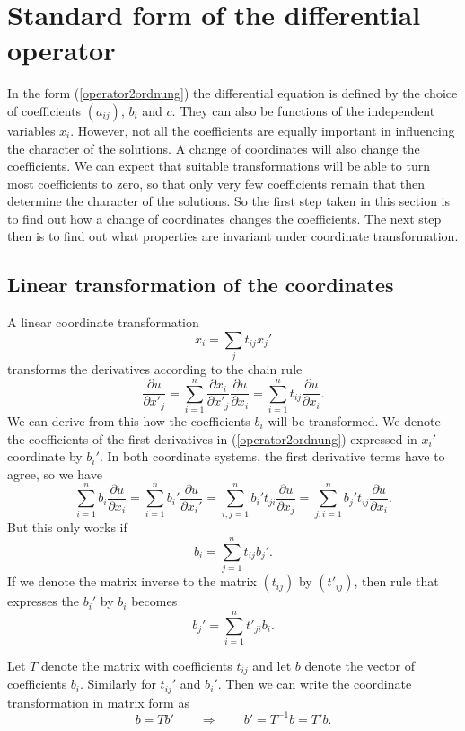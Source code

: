 %
%
%
\section{Standard form of the differential operator}
In the form (\ref{operator2ordnung})
the differential equation is defined by the choice of coefficients
$(a_{ij})$, $b_i$ and $c$.
They can also be functions of the independent variables $x_i$.
However, not all the coefficients are equally important in influencing
the character of the solutions.
A change of coordinates will also change the coefficients.
We can expect that suitable transformations will be able to turn
most coefficients to zero, so that only very few coefficients remain
that then determine the character of the solutions.
So the first step taken in this section is to find out how a change
of coordinates changes the coefficients.
The next step then is to find out what properties are invariant
under coordinate transformation.

\subsection{Linear transformation of the coordinates
\label{lineare-transformation}}
A linear coordinate transformation
\[
x_i=\sum_{j}t_{ij}x_j'
\]
transforms the derivatives according to the chain rule
\[
\frac{\partial u}{\partial x'_j}
=
\sum_{i=1}^n
\frac{\partial x_i}{\partial x'_j} \frac{\partial u}{\partial x_i}
=
\sum_{i=1}^nt_{ij}\frac{\partial u}{\partial x_i}.
\]
We can derive from this how the coefficients $b_i$ will be transformed.
We denote the coefficients of the first derivatives in
(\ref{operator2ordnung}) expressed in $x_i'$-coordinate by $b_i'$.
In both coordinate systems, the first derivative terms have to agree, so
we have
\[
\sum_{i=1}^n b_i\frac{\partial u}{\partial x_i}
=
\sum_{i=1}^n b_i'\frac{\partial u}{\partial x_i'}
=
\sum_{i,j=1}^n b_i't_{ji}\frac{\partial u}{\partial x_j}
=
\sum_{j,i=1}^n b_j't_{ij}\frac{\partial u}{\partial x_i}.
\]
But this only works if
\[
b_i = \sum_{j=1}^n t_{ij}b_j'.
\]
If we denote the matrix inverse to the matrix $(t_{ij})$ by $(t'_{ij})$,
then rule that expresses the $b_i'$ by $b_i$ becomes
\[
b_j'=\sum_{i=1}^n t'_{ji}b_i.
\]

Let $T$ denote the matrix with coefficients $t_{ij}$ and let $b$
denote the vector of coefficients $b_i$.
Similarly for $t_{ij}'$ and $b_i'$.
Then we can write the coordinate transformation in matrix form as
\[
b=Tb'
\qquad\Rightarrow\qquad
b'=T^{-1}b=T'b.
\]

